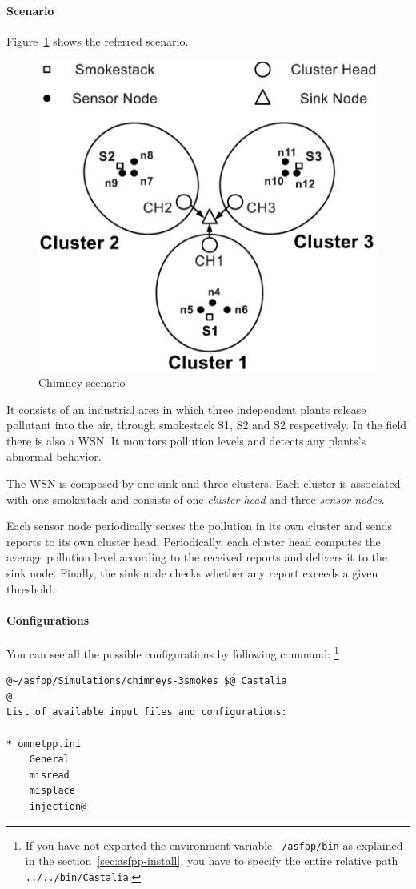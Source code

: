 \paragraph{Scenario}
Figure~\ref{fig:chimney-scenario} shows the referred scenario. 
%
\begin{figure}
\centering
\includegraphics[width=.55\textwidth]{images/raster/scenario}
\caption{Chimney scenario}
\label{fig:chimney-scenario}
\end{figure} 
%
It consists of an industrial area in which three independent plants release pollutant into the air, through smokestack S1, S2 and S2 respectively. In the field there is also a WSN. It monitors pollution levels and detects any plants's abnormal behavior.

The WSN is composed by one sink and three clusters. Each cluster is associated with one smokestack and consists of one \emph{cluster head} and three \emph{sensor nodes}.

Each sensor node periodically senses the pollution in its own cluster and sends reports to its own cluster head. Periodically, each cluster head computes the average pollution level according to the received reports and delivers it to the sink node. Finally, the sink node checks whether any report exceeds a given threshold.

\paragraph{Configurations}
You can see all the possible configurations by following command: \footnote{If you have not exported the environment variable \texttt{~/asfpp/bin} as explained in the section~\ref{sec:asfpp-install}, you have to specify the entire relative path \texttt{../../bin/Castalia}.}
%
\begin{lstlisting}[language={terminal}]
@~/asfpp/Simulations/chimneys-3smokes $@ Castalia 
@
List of available input files and configurations:

* omnetpp.ini
	General
	misread
	misplace
	injection@
\end{lstlisting}

